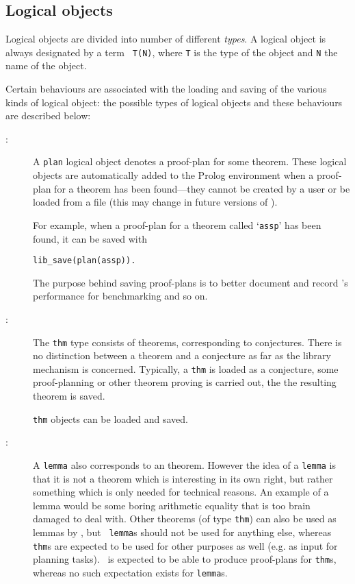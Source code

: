\subsection {Logical objects}
\label {logical-objects}
Logical objects are divided into number of different {\em {} types}. A logical object is always designated by a term {\tt
T(N)}, where {\tt T} is the type of the object and {\tt N} the name of
the object. 


Certain behaviours are associated with the loading and saving of the various kinds of logical object: the possible types of logical objects and these behaviours are described below:

\begin{description}
\item[{\tt {}}:]
A {\tt plan} logical object
denotes a proof-plan for some theorem.  These logical objects are
automatically added to the Prolog environment when a proof-plan for a
theorem has been found---they cannot be created by a user or be loaded
from a file (this may change in future versions of \clam{}).

For example, when a proof-plan for a theorem called `{\tt assp}' has
been found, it can be saved with
\begin{verbatim}
lib_save(plan(assp)).
\end{verbatim}
The purpose behind saving proof-plans is to better document and
record \clam's performance for benchmarking and so on.

\item[{\tt {}}:]
The {\tt thm} type consists of theorems, corresponding to \oyster
conjectures. There is no distinction
between a theorem and a conjecture as far as the library mechanism is
concerned.  Typically, a {\tt thm} is loaded as a conjecture, some
proof-planning or other theorem proving is carried out, the the
resulting theorem is saved.

{\tt thm} objects can be loaded and saved.

\item[{\tt {}}:]
A {\tt lemma} also corresponds to an \oyster theorem. However the idea
of a {\tt lemma} is that it is not a theorem which is interesting in
its own right, but rather something which is only needed for technical
reasons.  An example of a lemma would be some boring arithmetic
equality that \oyster is too brain damaged to deal with. Other theorems
(of type {\tt thm}) can also be used as lemmas by \clam, but {\tt
lemma}s should not be used for anything else, whereas {\tt thm}s are
expected to be used for other purposes as well (e.g. as input for
planning tasks).  \clam\ is expected to be able to produce proof-plans
for {\tt thm}s, whereas no such expectation exists for {\tt lemma}s.


\end{description}
